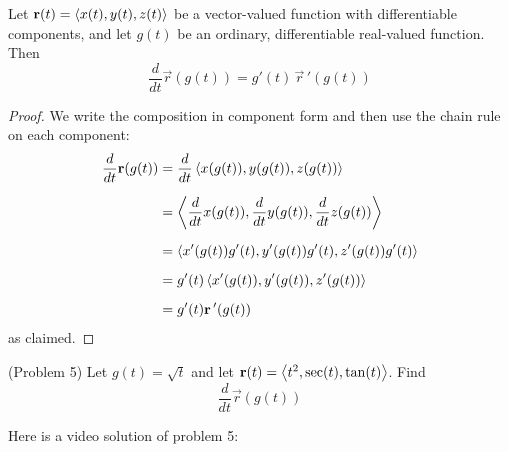 \documentclass[handout]{ximera}
\begin{document}
\begin{proposition}
Let $\mathbf r(t) = \left\langle x(t), y(t),z(t)\right\rangle$ be a vector-valued function with differentiable components, and let $g(t)$ be an ordinary, differentiable real-valued function.
Then
\[
\frac{d}{dt}\vec r(g(t)) = g'(t)\,\vec r\,'(g(t))
\]
\end{proposition}
\begin{proof}
We write the composition in component form and then use the chain rule on each component:
\begin{align*}
\frac{d}{dt} \mathbf r(g(t)) &= \frac{d}{dt} \left\langle x(g(t)), y(g(t)),z(g(t))\right\rangle\\[6pt]
&= \left\langle \frac{d}{dt} x(g(t)), \frac{d}{dt} y(g(t)), \frac{d}{dt} z(g(t))\right\rangle\\[6pt]
&= \left\langle x'(g(t)) g'(t), y'(g(t)) g'(t), z'(g(t)) g'(t)\right\rangle\\[6pt]
&= g'(t)\left\langle x'(g(t)), y'(g(t)), z'(g(t))\right\rangle\\[6pt]
&= g'(t) \mathbf r\,'(g(t))
\end{align*}
as claimed.
\end{proof}

\begin{problem}(Problem 5)
Let $g(t) = \sqrt t$ and let $\mathbf r(t) = \left\langle t^2, \sec(t), \tan(t)\right\rangle$. Find
\[
\frac{d}{dt} \vec r(g(t))
\]
\end{problem}
 
Here is a video solution of problem 5:\\
\begin{foldable}
\end{foldable}
\end{document}
